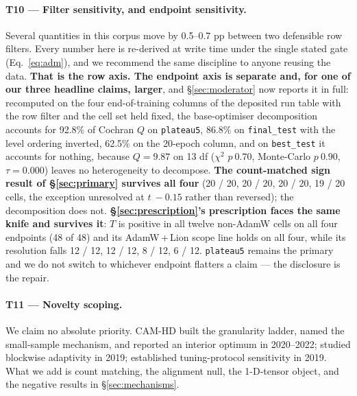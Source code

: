 \documentclass[10pt,letterpaper]{article}
\newcommand{\Tstat}{T}                         %
\newcommand{\plateau}{\texttt{plateau5}}
\begin{document}
\paragraph{T10 --- Filter sensitivity, and endpoint sensitivity.}
Several quantities in this corpus move by 0.5--0.7 pp between two defensible row filters. Every
number here is re-derived at write time under the single stated gate (Eq.~\ref{eq:adm}), and we
recommend the same discipline to anyone reusing the data. \textbf{That is the row axis. The
endpoint axis is separate and, for one of our three headline claims, larger}, and
\S\ref{sec:moderator} now reports it in full: recomputed on the four end-of-training columns of
the deposited run table with the row filter and the cell set held fixed, the base-optimiser
decomposition accounts for 92.8\% of Cochran $Q$ on \plateau{}, 86.8\% on \texttt{final\_test}
with the level ordering inverted, 62.5\% on the 20-epoch column, and on \texttt{best\_test} it
accounts for nothing, because $Q = 9.87$ on 13 df ($\chi^2$ $p\ 0.70$, Monte-Carlo $p\ 0.90$,
$\tau = 0.000$) leaves no
heterogeneity to decompose. \textbf{The count-matched sign result of \S\ref{sec:primary} survives
all four} (20 / 20, 20 / 20, 20 / 20, 19 / 20 cells, the exception unresolved at $t\ -0.15$ rather
than reversed); the decomposition does not. \textbf{\S\ref{sec:prescription}'s prescription faces
the same knife and survives it}: $\Tstat$ is positive in all twelve non-AdamW cells on all four
endpoints (48 of 48) and its AdamW\,+\,Lion scope line holds on all four, while its resolution
falls 12 / 12, 12 / 12, 8 / 12, 6 / 12. \plateau{} remains the primary and we do not switch to
whichever endpoint flatters a claim --- the disclosure is the repair.

\paragraph{T11 --- Novelty scoping.}
We claim no absolute priority. CAM-HD \citep{jie2022camhd} built the granularity ladder, named the
small-sample mechanism, and reported an interior optimum in 2020--2022;
\citet{zheng2019blockwise} studied blockwise adaptivity in 2019; \citet{choi2020empirical}
established tuning-protocol sensitivity in 2019. What we add is count matching, the alignment null,
the 1-D-tensor object, and the negative results in \S\ref{sec:mechanisms}.
\end{document}
